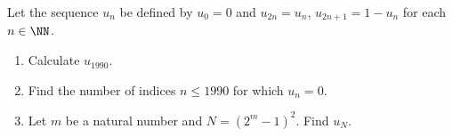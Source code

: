 Let the sequence $u_n$ be defined by $u_0 = 0$ and $u_{2n} = u_n$, $u_{2n+1} = 1 - u_n$ for each $n \in \NN$.

\begin{enumerate}[label = (\alph*)]
	\item Calculate $u_{1990}$.
	\item Find the number of indices $n \le 1990$ for which $u_n = 0$.
	\item Let $m$ be a natural number and $N = (2^m - 1)^2$. Find $u_N$.
\end{enumerate}
